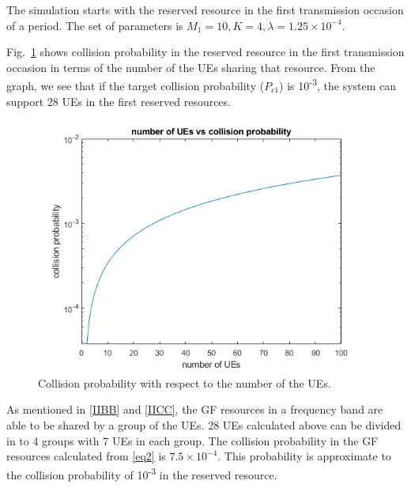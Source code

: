 \documentclass[conference]{IEEEtran}
\begin{document}
The simulation starts with the reserved resource in the first transmission occasion of a period. The set of parameters is $M_1=10, K=4, \lambda=1.25\times10^{-4}$.

Fig.~\ref{fig7} shows collision probability in the reserved resource in the first transmission occasion in terms of the number of the UEs sharing that resource. From the graph, we see that if the target collision probability ($P_{c1}$) is 10\textsuperscript{-3}, the system can support 28 UEs in the first reserved resources.

\begin{figure}[htbp]
\centerline{\includegraphics[scale=0.32]{fig7.png}}
\caption{Collision probability with respect to the number of the UEs.}
\label{fig7}
\end{figure}

As mentioned in \ref{IIBB} and \ref{IICC}, the GF resources in a frequency band are able to be shared by a group of the UEs. 28 UEs calculated above can be divided in to 4 groups with 7 UEs in each group. The collision probability in the GF resources calculated from \eqref{eq2} is $7.5\times10^{-4}$. This probability is approximate to the collision probability of 10\textsuperscript{-3} in the reserved resource.
\end{document}
